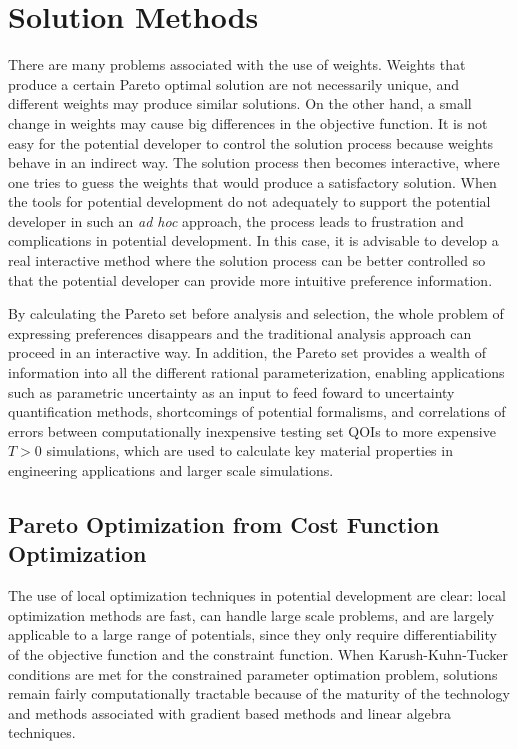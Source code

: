 \section{Solution Methods}
There are many problems associated with the use of weights.  Weights that produce a certain Pareto optimal solution are not necessarily unique, and different weights may produce similar solutions.  On the other hand, a small change in weights may cause big differences in the objective function.  It is not easy for the potential developer to control the solution process because weights behave in an indirect way.  The solution process then becomes interactive, where one tries to guess the weights that would produce a satisfactory solution.  When the tools for potential development do not adequately to support the potential developer in such an \emph{ad hoc} approach, the process leads to frustration and complications in potential development.  In this case, it is advisable to develop a real interactive method where the solution process can be better controlled so that the potential developer can provide more intuitive preference information.

By calculating the Pareto set before analysis and selection, the whole problem of expressing preferences disappears and the traditional analysis approach can proceed in an interactive way.  In addition, the Pareto set provides a wealth of information into all the different rational parameterization, enabling applications such as parametric uncertainty as an input to feed foward to uncertainty quantification methods, shortcomings of potential formalisms, and correlations of errors between computationally inexpensive testing set QOIs to more expensive $T>0$ simulations, which are used to calculate key material properties in engineering applications and larger scale simulations.

\subsection{Pareto Optimization from Cost Function Optimization}
\label{sec:pareto_w_cost_function}

The use of local optimization techniques in potential development are clear: local optimization methods are fast, can handle large scale problems, and are largely applicable to a large range of potentials, since they only require differentiability of the objective function and the constraint function\cite{boyd_convex_optimization}.  When Karush-Kuhn-Tucker conditions\cite{karush1939_kkt,kuhn1951_kkt} are met for the constrained parameter optimation problem, solutions remain fairly computationally tractable because of the maturity of the technology and methods associated with gradient based methods and linear algebra techniques.


